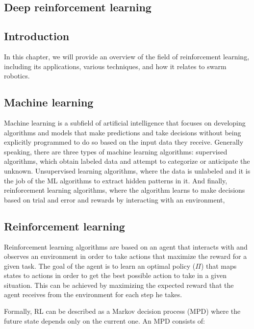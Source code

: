 \documentclass[12pt]{extarticle}
\begin{document}
\newpage
\pagebreak
\hspace{0pt}
\vfill
\begin{center}
\section{Deep reinforcement learning}
\end{center}
\vfill
\hspace{0pt}

\pagebreak

\subsection{Introduction}
In this chapter, we will provide an overview of the field of reinforcement learning, including its applications, various techniques, and how it relates to swarm robotics. 
\subsection{Machine learning}
Machine learning is a subfield of artificial intelligence that focuses on developing algorithms and models that make predictions and take decisions without being explicitly programmed to do so based on the input data they receive. Generally speaking, there are three types of machine learning algorithms: supervised algorithms, which obtain labeled data and attempt to categorize or anticipate the unknown. Unsupervised learning algorithms, where the data is unlabeled and it is the job of the ML algorithms to extract hidden patterns in it. And finally, reinforcement learning algorithms, where the algorithm learns to make decisions based on trial and error and rewards by interacting with an environment,

\subsection{Reinforcement learning}
Reinforcement learning algorithms are based on an agent that interacts with and observes an environment in order to take actions that maximize the reward for a given task.
The goal of the agent is to learn an optimal policy ($\Pi$) that maps states to actions in order to get the best possible action to take in a given situation. This can be achieved by maximizing the expected reward that the agent receives from the environment for each step he takes. \cite{arulkumaran2017brief}

Formally, RL can be described as a Markov decision process (MPD) where the future state depends only on the current one. An MPD consists of:
\end{document}
